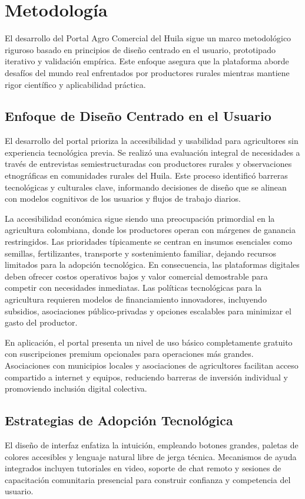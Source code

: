\section{Metodología}

El desarrollo del Portal Agro Comercial del Huila sigue un marco metodológico riguroso basado en principios de diseño centrado en el usuario, prototipado iterativo y validación empírica. Este enfoque asegura que la plataforma aborde desafíos del mundo real enfrentados por productores rurales mientras mantiene rigor científico y aplicabilidad práctica.

\subsection{Enfoque de Diseño Centrado en el Usuario}
El desarrollo del portal prioriza la accesibilidad y usabilidad para agricultores sin experiencia tecnológica previa. Se realizó una evaluación integral de necesidades a través de entrevistas semiestructuradas con productores rurales y observaciones etnográficas en comunidades rurales del Huila. Este proceso identificó barreras tecnológicas y culturales clave, informando decisiones de diseño que se alinean con modelos cognitivos de los usuarios y flujos de trabajo diarios.

La accesibilidad económica sigue siendo una preocupación primordial en la agricultura colombiana, donde los productores operan con márgenes de ganancia restringidos. Las prioridades típicamente se centran en insumos esenciales como semillas, fertilizantes, transporte y sostenimiento familiar, dejando recursos limitados para la adopción tecnológica. En consecuencia, las plataformas digitales deben ofrecer costos operativos bajos y valor comercial demostrable para competir con necesidades inmediatas. Las políticas tecnológicas para la agricultura requieren modelos de financiamiento innovadores, incluyendo subsidios, asociaciones público-privadas y opciones escalables para minimizar el gasto del productor.

En aplicación, el portal presenta un nivel de uso básico completamente gratuito con suscripciones premium opcionales para operaciones más grandes. Asociaciones con municipios locales y asociaciones de agricultores facilitan acceso compartido a internet y equipos, reduciendo barreras de inversión individual y promoviendo inclusión digital colectiva.

\subsection{Estrategias de Adopción Tecnológica}
El diseño de interfaz enfatiza la intuición, empleando botones grandes, paletas de colores accesibles y lenguaje natural libre de jerga técnica. Mecanismos de ayuda integrados incluyen tutoriales en video, soporte de chat remoto y sesiones de capacitación comunitaria presencial para construir confianza y competencia del usuario.

